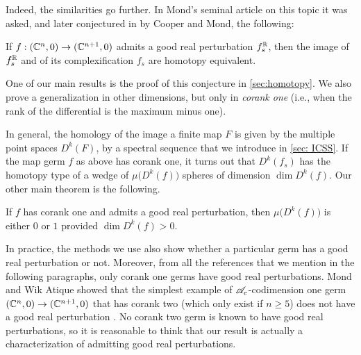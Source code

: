 \documentclass[a4paper,12pt]{amsart}
\begin{document}
Indeed, the similarities go further. In Mond's seminal article on this topic \cite{Mond1996} it was asked, and later conjectured in \cite{Cooper1998} by Cooper and Mond, the following:

\begin{conjecture*}[\ref*{conj:grp}]
If $f:(\mathbb{C}^n,0)\to(\mathbb{C}^{n+1},0)$ admits a good real perturbation $f_s^{\mathbb{R}}$, then the image of $f_s^{\mathbb{R}}$ and of its complexification $f_s$ are homotopy equivalent.
\end{conjecture*}

One of our main results is the proof of this conjecture in \cref{sec:homotopy}. We also prove a generalization in other dimensions, but only in \textsl{corank one} (i.e., when the rank of the differential is the maximum minus one).

In general, the homology of the image a finite map $F$ is given by the multiple point spaces $D^k(F)$, by a spectral sequence that we introduce in \cref{sec: ICSS}. If the map germ $f$ as above has corank one, it turns out that $D^k(f_s)$ has the homotopy type of a wedge of $\mu\big(D^k(f)\big)$ spheres of dimension $\dim D^k(f)$. Our other main theorem is the following.

\begin{theorem*}[\ref*{main}]
If $f$ has corank one and admits a good real perturbation, then $\mu\big(D^k(f)\big)$ is either $0$ or $1$ provided $\dim D^k(f)>0$.
\end{theorem*}

In practice, the methods we use also show whether a particular germ has a good real perturbation or not. Moreover, from all the references that we mention in the following paragraphs, only corank one germs have good real perturbations. Mond and Wik Atique showed that the simplest example of $\mathscr{A}_e$-codimension one germ $(\mathbb{C}^n,0)\to(\mathbb{C}^{n+1},0)$ that has corank two (which only exist if $n\geq 5$) does not have a good real perturbation \cite{Mond2003}. No corank two germ is known to have good real perturbations, so it is reasonable to think that our result is actually a characterization of admitting good real perturbations.
\newline
\end{document}
